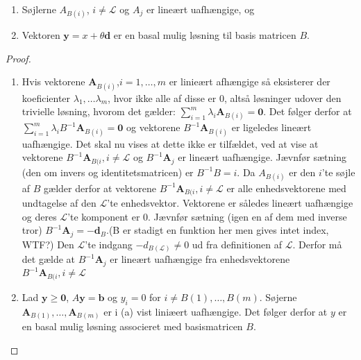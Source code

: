% 
\begin{thm}{}{}
\begin{enumerate}[label = (\alph*)]
\item Søjlerne $A_{B(i)}$, $i \neq \mathcal{L}$ og $A_j$ er lineært uafhængige, og 
\item Vektoren $\mathbf{y}=x+ \theta \mathbf{d}$ er en basal mulig løsning til basis matricen $B$. %
\end{enumerate}
\end{thm}
%
\begin{proof}
\begin{enumerate}[label = (\alph*)]
\item Hvis vektorene $\mathbf{A}_{B(i)}$,$i=1,\ldots,m$ er linieært afhængige så eksisterer der koeficienter $\lambda_1,\ldots \lambda_m$, hvor ikke alle af disse er $0$, altså løsninger udover den trivielle løsning, hvorom det gælder:
$ \sum_{i=1}^m \lambda_i \mathbf{A}_{B(i)}=\mathbf{0} $. 
Det følger derfor at $\sum_{i=1}^m \lambda_i B^{-1}\mathbf{A}_{B(i)}=\mathbf{0}$ og vektorene $B^{-1}\mathbf{A}_{B(i)}$ er ligeledes lineært uafhængige. Det skal nu vises at dette ikke er tilfældet, ved at vise at vektorene $B^{-1}\mathbf{A}_{B(i},i\neq \mathcal{L}$ og $B^{-1}\mathbf{A}_j$ er lineært uafhængige.
Jævnfør sætning (den om invers og identitetsmatricen) er $B^{-1}B=i$.
Da $A_{B(i)}$ er den $i$'te søjle af $B$ gælder derfor at vektorene $B^{-1}\mathbf{A}_{B(i},i\neq \mathcal{L}$  er alle enhedsvektorene med undtagelse af den $\mathcal{L}$'te enhedsvektor. 
Vektorene er således lineært uafhængige og deres  $\mathcal{L}$'te komponent er $0$.
Jævnfør sætning (igen en af dem med inverse tror) $B^{-1}\mathbf{A}_j=-\mathbf{d}_B$.(B er stadigt en funktion her men gives intet index, WTF?) 
Den $\mathcal{L}$'te indgang $-d_{B(\mathcal{L})}\neq 0$ ud fra definitionen af $\mathcal{L}$.
Derfor må det gælde at $B^{-1} \mathbf{A}_j$ er lineært uafhængige fra enhedsvektorene $B^{-1}\mathbf{A}_{B(i},i\neq \mathcal{L}$ \\
\item Lad $\mathbf{y}\geq \mathbf{0}$, $A\mathbf{y}=\mathbf{b}$ og $y_i=0$ for $i \neq B(1),\ldots,B(m)$. Søjerne $\mathbf{A}_{B(1)},\ldots,\mathbf{A}_{B(m)}$ er i (a) vist liniæert uafhængige. Det følger derfor at $y$ er en basal mulig løsning associeret med basismatricen $B$.
\end{enumerate}
\end{proof}
\\
%
